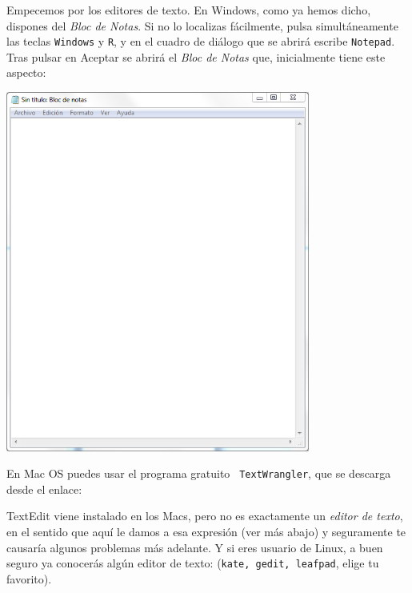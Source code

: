 \documentclass[10pt,a4paper]{article}\usepackage[]{graphicx}\usepackage[]{color}
\begin{document}
Empecemos por los editores de texto. En Windows, como ya hemos dicho, dispones del {\em Bloc de
Notas}. Si no lo localizas fácilmente, pulsa simultáneamente las teclas {\tt Windows} y {\tt R}, y
en el cuadro de diálogo que se abrirá escribe {\tt Notepad}. Tras pulsar en Aceptar se abrirá el
{\em Bloc de Notas} que, inicialmente tiene este aspecto:
\begin{center}
\includegraphics[width=10cm]{../fig/Tut00-BlocDeNotas.png}
\end{center}
En Mac OS puedes usar el programa gratuito {\tt
TextWrangler}, que se descarga desde el enlace:
      \begin{center}
      \end{center}
TextEdit viene instalado en los Macs, pero no es exactamente un {\em editor de texto}, en el
sentido que aquí le damos a esa expresión (ver más abajo) y seguramente te causaría algunos problemas más adelante. Y si eres usuario de Linux, a buen
seguro ya conocerás algún editor de texto: ({\tt kate, gedit, leafpad}, elige tu favorito).
\end{document}
